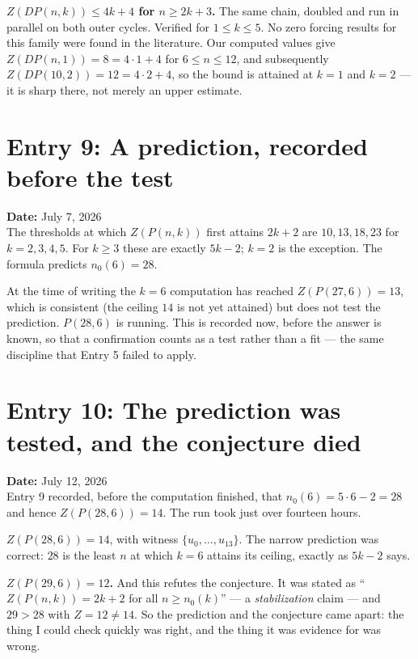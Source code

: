 \documentclass[12pt]{article}
\begin{document}
\textbf{$Z(DP(n,k))\le 4k+4$ for $n\ge2k+3$.} The same chain, doubled and run
in parallel on both outer cycles. Verified for $1\le k\le5$. No zero forcing
results for this family were found in the literature. Our computed values give
$Z(DP(n,1))=8=4\cdot1+4$ for $6\le n\le12$, and subsequently
$Z(DP(10,2))=12=4\cdot2+4$, so the bound is attained at $k=1$ and $k=2$ --- it
is sharp there, not merely an upper estimate.


\clearpage
\section*{Entry 9: A prediction, recorded before the test}
\textbf{Date:} July 7, 2026\\
The thresholds at which $Z(P(n,k))$ first attains $2k+2$ are $10,13,18,23$ for
$k=2,3,4,5$. For $k\ge3$ these are exactly $5k-2$; $k=2$ is the exception.
The formula predicts $n_0(6)=28$.

At the time of writing the $k=6$ computation has reached $Z(P(27,6))=13$, which
is consistent (the ceiling $14$ is not yet attained) but does not test the
prediction. $P(28,6)$ is running. This is recorded now, before the answer is
known, so that a confirmation counts as a test rather than a fit --- the same
discipline that Entry 5 failed to apply.



\clearpage
\section*{Entry 10: The prediction was tested, and the conjecture died}
\textbf{Date:} July 12, 2026\\
Entry 9 recorded, before the computation finished, that $n_0(6)=5\cdot6-2=28$
and hence $Z(P(28,6))=14$. The run took just over fourteen hours.

\textbf{$Z(P(28,6))=14$}, with witness $\{u_0,\dots,u_{13}\}$. The narrow
prediction was correct: $28$ is the least $n$ at which $k=6$ attains its
ceiling, exactly as $5k-2$ says.

\textbf{$Z(P(29,6))=12$.} And this refutes the conjecture. It was stated as
``$Z(P(n,k))=2k+2$ for all $n\ge n_0(k)$'' --- a \emph{stabilization} claim ---
and $29>28$ with $Z=12\ne14$. So the prediction and the conjecture came apart:
the thing I could check quickly was right, and the thing it was evidence for
was wrong.
\end{document}
